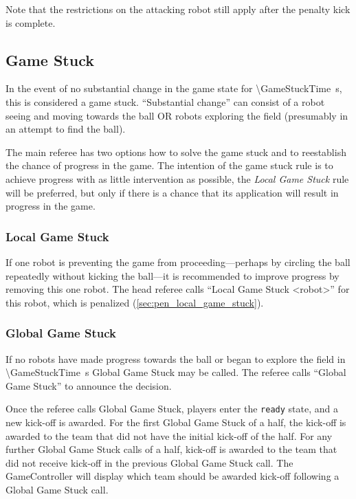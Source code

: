 Note that the restrictions on the attacking robot still apply after the penalty kick is complete.

\subsection{Game Stuck}
\label{sec:game_stuck}

In the event of no substantial change in the game state for \qty{\GameStuckTime}{\second}, this is considered a game stuck.
``Substantial change'' can consist of a robot seeing and moving towards the ball OR robots exploring the field (presumably in an attempt to find the ball).

The main referee has two options how to solve the game stuck and to reestablish the chance of progress in the game.
The intention of the game stuck rule is to achieve progress with as little intervention as possible, \ie the \emph{Local Game Stuck} rule will be preferred, but only if there is a chance that its application will result in progress in the game.

\subsubsection{Local Game Stuck}
\label{sec:game_stuck:local}

If one robot is preventing the game from proceeding---perhaps by circling the ball repeatedly without kicking the ball---it is recommended to improve progress by removing this one robot.
The head referee calls ``Local Game Stuck \textless robot\textgreater'' for this robot, which is penalized (\cf \cref{sec:pen_local_game_stuck}).

\subsubsection{Global Game Stuck}
\label{sec:game_stuck:global}

If no robots have made progress towards the ball or began to explore the field in \qty{\GameStuckTime}{\second} Global Game Stuck may be called.
The referee calls ``Global Game Stuck'' to announce the decision.

Once the referee calls Global Game Stuck, players enter the \texttt{ready} state, and a new kick-off is awarded.
For the first Global Game Stuck of a half, the kick-off is awarded to the team that did not have the initial kick-off of the half.
For any further Global Game Stuck calls of a half, kick-off is awarded to the team that did not receive kick-off in the previous Global Game Stuck call.
The GameController will display which team should be awarded kick-off following a Global Game Stuck call.

